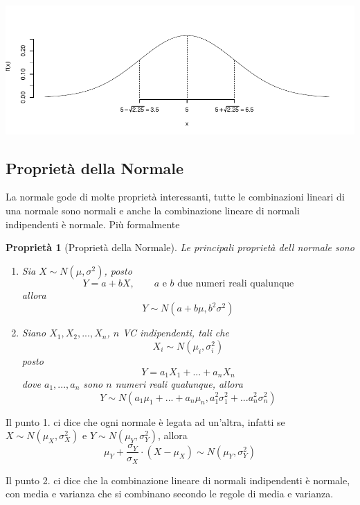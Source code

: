 \documentclass[
  11pt,
]{book}
\providecommand{\tightlist}{%
  \setlength{\itemsep}{0pt}\setlength{\parskip}{0pt}}
\theoremstyle{mytheoremstyle}
\newtheorem{proposition}{Proprietà}[section]
\theoremstyle{mydefstyle}
\begin{document}
\begin{center}\includegraphics{Appunti_di_Statistica_2025_files/figure-latex/07c-Normale-4,-1} \end{center}

\subsection{Proprietà della Normale}\label{proprietuxe0-della-normale}

La normale gode di molte proprietà interessanti, tutte le combinazioni lineari di
una normale sono normali e anche la combinazione lineare di normali indipendenti
è normale. Più formalmente

\begin{proposition}[Proprietà della Normale]

Le principali proprietà dell normale sono

\begin{enumerate}
\def\labelenumi{\arabic{enumi}.}
\tightlist
\item
  Sia \(X\sim N(\mu,\sigma^2)\), posto
  \[Y=a+bX,\qquad\text{$a$ e $b$ due numeri reali qualunque}\]
  allora
  \[Y\sim N(a+b\mu,b^2\sigma^2)\]
\item
  Siano \(X_1, X_2,...,X_n\), \(n\) VC indipendenti, tali che
  \[X_i\sim N(\mu_i,\sigma_i^2)\]
  posto
  \[Y=a_1X_1+...+a_nX_n\]
  dove \(a_1,...,a_n\) sono \(n\) numeri reali qualunque, allora
  \[Y\sim N(a_1\mu_1+...+a_n\mu_n,a_1^2\sigma_1^2+...a_n^2\sigma_n^2)\]
\end{enumerate}

\end{proposition}

Il punto 1. ci dice che ogni normale è legata ad un'altra, infatti se \(X\sim N(\mu_X,\sigma_X^2)\) e \(Y\sim N(\mu_Y,\sigma_Y^2)\), allora
\[
\mu_Y+\frac{\sigma_Y}{\sigma_X}\cdot (X-\mu_X)\sim N(\mu_Y,\sigma_Y^2)
\]

Il punto 2. ci dice che la combinazione lineare di normali indipendenti è normale,
con media e varianza che si combinano secondo le regole di media e varianza.
\end{document}
